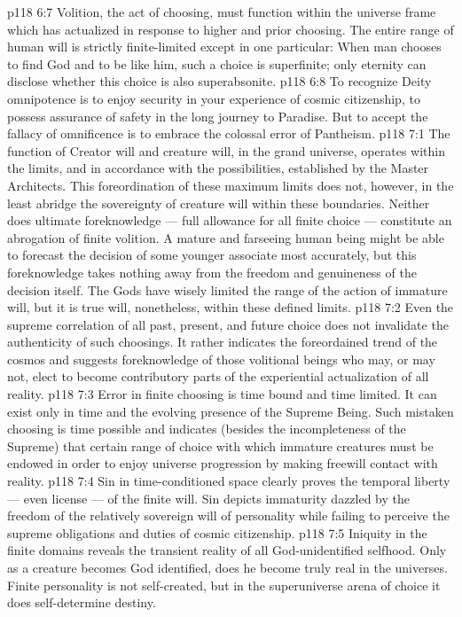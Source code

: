 \vs p118 6:7 Volition, the act of choosing, must function within the universe frame which has actualized in response to higher and prior choosing. The entire range of human will is strictly finite\hyp{}limited except in one particular: When man chooses to find God and to be like him, such a choice is superfinite; only eternity can disclose whether this choice is also superabsonite.
\vs p118 6:8 \pc To recognize Deity omnipotence is to enjoy security in your experience of cosmic citizenship, to possess assurance of safety in the long journey to Paradise. But to accept the fallacy of omnificence is to embrace the colossal error of Pantheism.
\vs p118 7:1 The function of Creator will and creature will, in the grand universe, operates within the limits, and in accordance with the possibilities, established by the Master Architects. This foreordination of these maximum limits does not, however, in the least abridge the sovereignty of creature will within these boundaries. Neither does ultimate foreknowledge --- full allowance for all finite choice --- constitute an abrogation of finite volition. A mature and farseeing human being might be able to forecast the decision of some younger associate most accurately, but this foreknowledge takes nothing away from the freedom and genuineness of the decision itself. The Gods have wisely limited the range of the action of immature will, but it is true will, nonetheless, within these defined limits.
\vs p118 7:2 Even the supreme correlation of all past, present, and future choice does not invalidate the authenticity of such choosings. It rather indicates the foreordained trend of the cosmos and suggests foreknowledge of those volitional beings who may, or may not, elect to become contributory parts of the experiential actualization of all reality.
\vs p118 7:3 \pc Error in finite choosing is time bound and time limited. It can exist only in time and  the evolving presence of the Supreme Being. Such mistaken choosing is time possible and indicates (besides the incompleteness of the Supreme) that certain range of choice with which immature creatures must be endowed in order to enjoy universe progression by making freewill contact with reality.
\vs p118 7:4 Sin in time\hyp{}conditioned space clearly proves the temporal liberty --- even license --- of the finite will. Sin depicts immaturity dazzled by the freedom of the relatively sovereign will of personality while failing to perceive the supreme obligations and duties of cosmic citizenship.
\vs p118 7:5 Iniquity in the finite domains reveals the transient reality of all God\hyp{}unidentified selfhood. Only as a creature becomes God identified, does he become truly real in the universes. Finite personality is not self\hyp{}created, but in the superuniverse arena of choice it does self\hyp{}determine destiny.
